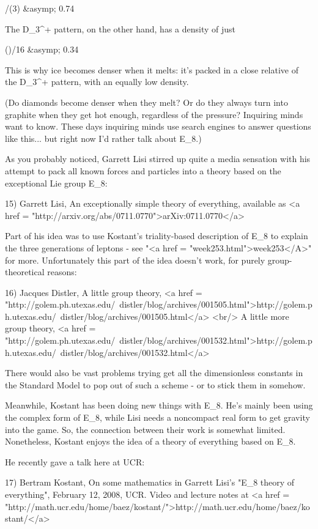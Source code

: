\pi  /(3)   &asymp;   0.74

The D_{3}^{+} pattern, on the other hand, has a
density of just

(\pi {})/16   &asymp;   0.34  

This is why ice becomes denser when it melts: it's packed in 
a close relative of the D_{3}^{+} pattern, with
an equally low density.

(Do diamonds become denser when they melt?  Or do they always turn
into graphite when they get hot enough, regardless of the pressure?
Inquiring minds want to know.  These days inquiring minds use search
engines to answer questions like this... but right now I'd rather talk
about E_{8}.)

As you probably noticed, Garrett Lisi stirred up quite a media 
sensation with his attempt to pack all known forces and particles 
into a theory based on the exceptional Lie group E_{8}:

15) Garrett Lisi, An exceptionally simple theory of everything,
available as <a href = "http://arxiv.org/abs/0711.0770">arXiv:0711.0770</a>

Part of his idea was to use Kostant's triality-based description of
E_{8} to explain the three generations of leptons - see
"<a href = "week253.html">week253</A>" for more.
Unfortunately this part of the idea doesn't work, for purely
group-theoretical reasons:

16) Jacques Distler, A little group theory,
<a href = "http://golem.ph.utexas.edu/~distler/blog/archives/001505.html">http://golem.ph.utexas.edu/~distler/blog/archives/001505.html</a>  <br/>
A little more group theory, 
<a href = "http://golem.ph.utexas.edu/~distler/blog/archives/001532.html">http://golem.ph.utexas.edu/~distler/blog/archives/001532.html</a>

There would also be vast problems trying get all the dimensionless
constants in the Standard Model to pop out of such a scheme - or 
to stick them in somehow.

Meanwhile, Kostant has been doing new things with E_{8}.  He's
mainly been using the complex form of E_{8}, while Lisi needs
a noncompact real form to get gravity into the game. So, the
connection between their work is somewhat limited.  Nonetheless,
Kostant enjoys the idea of a theory of everything based on
E_{8}.

He recently gave a talk here at UCR:

17) Bertram Kostant, On some mathematics in Garrett Lisi's
"E_{8} theory of everything", February 12, 2008,
UCR.  Video and lecture notes at
<a href = "http://math.ucr.edu/home/baez/kostant/">http://math.ucr.edu/home/baez/kostant/</a>

